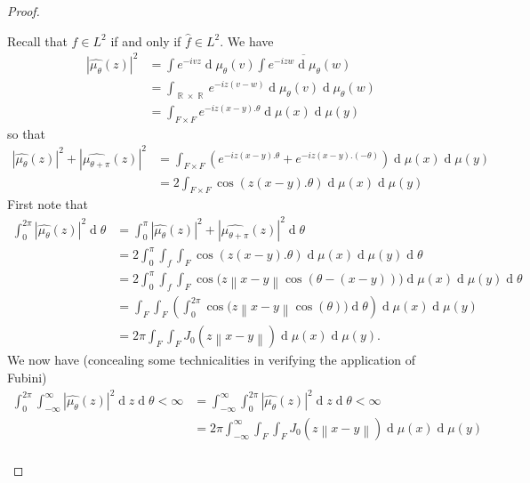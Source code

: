 \documentclass[11pt, a4paper]{memoir}
\DeclareMathOperator{\R}{{\mathbb{R}}}
\newcommand{\norm}[1]{\ensuremath{\left\lVert#1\right\rVert}}
\theoremstyle{change}
\theoremstyle{plain}
\theoremstyle{nonumberplain}
\newtheorem{proof}{Proof}
\renewcommand{\d}[1]{\ensuremath{\operatorname{d}\!{#1}}}
\numberwithin{equation}{section}
\begin{document}
\begin{proof}
\begin{enumerate}[nl,r]
            Recall that $f\in L^2$ if and only if $\hat{f}\in L^2$.
            We have
            \begin{align*}
                |\hat{\mu_\theta}(z)|^2 &= \int e^{-ivz}\d{\mu_\theta}(v)\overline{\int e^{-izw}\d{\mu_\theta(w)}}\\
                                        &= \int_{\R\times\R}e^{-iz(v-w)}\d{\mu_\theta(v)}\d{\mu_\theta(w)}\\
                                        &= \int_{F\times F}e^{-iz(x-y).\theta}\d{\mu(x)}\d{\mu(y)}
            \end{align*}
            so that
            \begin{align*}
                |\hat{\mu_\theta}(z)|^2+|\hat{\mu_{\theta+\pi}}(z)|^2&= \int_{F\times F}\left(e^{-iz(x-y).\theta}+e^{-iz(x-y).(-\theta)}\right)\d{\mu(x)}\d{\mu(y)}\\
                                                                     &= 2\int_{F\times F}\cos(z(x-y).\theta)\d{\mu(x)}\d{\mu(y)}
            \end{align*}
            First note that
            \begin{align*}
                \int_0^{2\pi}|\hat{\mu_\theta}(z)|^2\d{\theta} &= \int_0^\pi|\hat{\mu_\theta}(z)|^2+|\hat{\mu_{\theta+\pi}}(z)|^2\d{\theta}\\
                                                               &= 2\int_0^\pi\int_f\int_F\cos(z(x-y).\theta)\d{\mu(x)}\d{\mu(y)}\d{\theta}\\
                                                               &= 2\int_0^\pi\int_f\int_F\cos\bigl(z\norm{x-y}\cos(\theta-(x-y))\bigr)\d{\mu(x)}\d{\mu(y)}\d{\theta}\\
                                                               &= \int_F\int_F\left(\int_0^{2\pi}\cos\bigl(z\norm{x-y}\cos(\theta)\bigr)\d{\theta}\right)\d{\mu(x)}\d{\mu(y)}\\
                                                               &= 2\pi\int_F\int_F J_0(z\norm{x-y})\d{\mu(x)}\d{\mu(y)}.
            \end{align*}
            We now have (concealing some technicalities in verifying the application of Fubini)
            \begin{align*}
                \int_0^{2\pi}\int_{-\infty}^\infty|\hat{\mu_\theta}(z)|^2\d{z}\d{\theta}<\infty &= \int_{-\infty}^\infty\int_0^{2\pi}|\hat{\mu_\theta}(z)|^2\d{z}\d{\theta}<\infty\\
                                                                                                &= 2\pi\int_{-\infty}^\infty\int_{F}\int_FJ_0(z\norm{x-y})\d{\mu(x)}\d{\mu(y)}\\

\end{align*}
\end{enumerate}
\end{proof}
\end{document}
